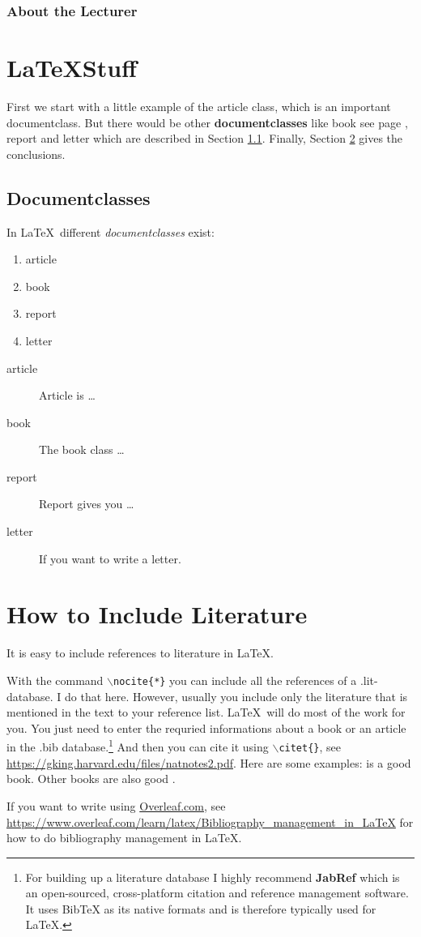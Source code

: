 \documentclass{article}
\begin{document}
\subsubsection*{About the Lecturer}



\section{\LaTeX Stuff}
	First we start with a little example of the article class, which is an 
	important documentclass. But there would be other \textbf{documentclasses} like 
	book see page \pageref{book}, report and letter  which are 
	described in Section \ref{documentclasses}. Finally, Section 
	\ref{conclusions} gives the conclusions.
	
\subsection{Documentclasses}\label{documentclasses}
In \LaTeX\ different \textit{documentclasses} exist:	
	\begin{enumerate}
		\item article
		\item book 
		\item report 
		\item letter 
	\end{enumerate}
	
	\begin{description}
		\item[article\label{article}]{Article is \ldots}
		\item[book\label{book}]{The book class \ldots}
		\item[report\label{report}]{Report gives you \ldots}
		\item[letter\label{letter}]{If you want to write a letter.}
	\end{description}
	
	\section{How to Include Literature}\label{conclusions}
It is easy to include references to literature in \LaTeX.

With the command \texttt{$\backslash$nocite\{*\}} you can include all the references of a .lit-database. I do that here. However, usually you include only the literature that is mentioned in the text to your reference list. \LaTeX\ will do most of the work for you. You just need to enter the requried informations about a book or an article in the .bib database.\footnote{For building up a literature database I highly recommend \textbf{JabRef} which is an open-sourced, cross-platform citation and reference management software. It uses BibTeX as its native formats and is therefore typically used for \LaTeX.} And then you can cite it using \texttt{$\backslash$citet\{\}}, see \url{https://gking.harvard.edu/files/natnotes2.pdf}.
Here are some examples:
\citet[][]{Wickham2016R} is a good book.
Other books are also good \citep[see][]{Lilja2016Linear, Matloff2011Art}.

If you want to write using \url{Overleaf.com}, see \url{https://www.overleaf.com/learn/latex/Bibliography_management_in_LaTeX} for how to do bibliography management in \LaTeX. 






\nocite{*}
	
	
	

	
\end{document}
